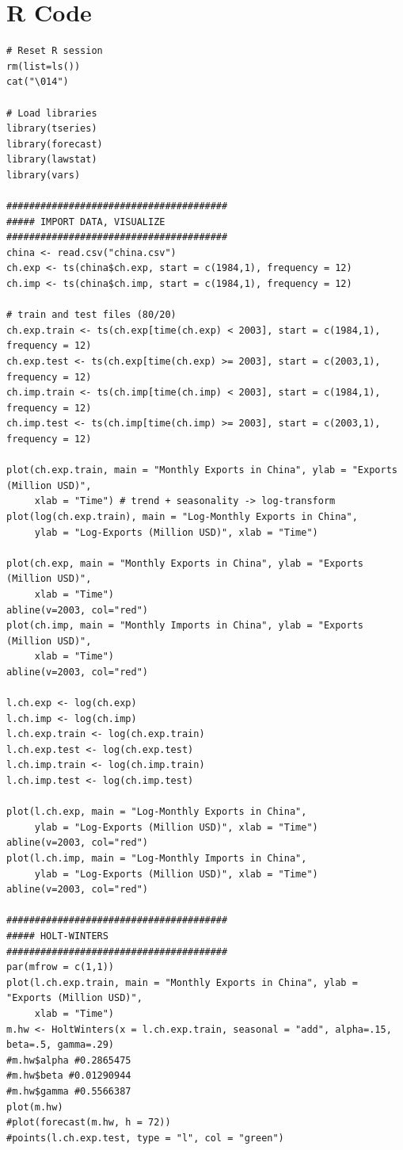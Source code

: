 \documentclass[]{article}
\begin{document}
\newpage
\section{R Code}
\color{blue}
\begin{Verbatim}[frame=single]
# Reset R session
rm(list=ls())
cat("\014")

# Load libraries
library(tseries)
library(forecast)
library(lawstat)
library(vars)

#######################################
##### IMPORT DATA, VISUALIZE
#######################################
china <- read.csv("china.csv")
ch.exp <- ts(china$ch.exp, start = c(1984,1), frequency = 12)
ch.imp <- ts(china$ch.imp, start = c(1984,1), frequency = 12)

# train and test files (80/20)
ch.exp.train <- ts(ch.exp[time(ch.exp) < 2003], start = c(1984,1), frequency = 12)
ch.exp.test <- ts(ch.exp[time(ch.exp) >= 2003], start = c(2003,1), frequency = 12)
ch.imp.train <- ts(ch.imp[time(ch.imp) < 2003], start = c(1984,1), frequency = 12)
ch.imp.test <- ts(ch.imp[time(ch.imp) >= 2003], start = c(2003,1), frequency = 12)

plot(ch.exp.train, main = "Monthly Exports in China", ylab = "Exports (Million USD)",
     xlab = "Time") # trend + seasonality -> log-transform
plot(log(ch.exp.train), main = "Log-Monthly Exports in China",
     ylab = "Log-Exports (Million USD)", xlab = "Time")

plot(ch.exp, main = "Monthly Exports in China", ylab = "Exports (Million USD)",
     xlab = "Time")
abline(v=2003, col="red")
plot(ch.imp, main = "Monthly Imports in China", ylab = "Exports (Million USD)",
     xlab = "Time")
abline(v=2003, col="red")

l.ch.exp <- log(ch.exp)
l.ch.imp <- log(ch.imp)
l.ch.exp.train <- log(ch.exp.train)
l.ch.exp.test <- log(ch.exp.test)
l.ch.imp.train <- log(ch.imp.train)
l.ch.imp.test <- log(ch.imp.test)

plot(l.ch.exp, main = "Log-Monthly Exports in China",
     ylab = "Log-Exports (Million USD)", xlab = "Time")
abline(v=2003, col="red")
plot(l.ch.imp, main = "Log-Monthly Imports in China",
     ylab = "Log-Exports (Million USD)", xlab = "Time")
abline(v=2003, col="red")

#######################################
##### HOLT-WINTERS
#######################################
par(mfrow = c(1,1))
plot(l.ch.exp.train, main = "Monthly Exports in China", ylab = "Exports (Million USD)",
     xlab = "Time")
m.hw <- HoltWinters(x = l.ch.exp.train, seasonal = "add", alpha=.15, beta=.5, gamma=.29)
#m.hw$alpha #0.2865475 
#m.hw$beta #0.01290944 
#m.hw$gamma #0.5566387 
plot(m.hw)
#plot(forecast(m.hw, h = 72))
#points(l.ch.exp.test, type = "l", col = "green")


\end{Verbatim}
\end{document}
